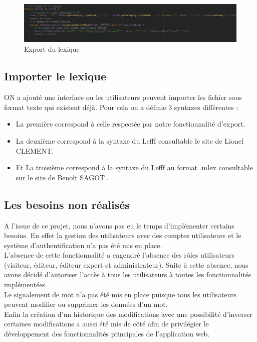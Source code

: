 \documentclass[12pt,a4paper]{article}
\begin{document}
    \begin{figure}[h]
        \centering
        \includegraphics[width=150mm]{img/exportLexique.PNG}
        \caption{Export du lexique}
        \label{Export}
    \end{figure}

    \subsection{Importer le lexique}

    ON a ajouté une interface ou les utilisateurs peuvent importer les fichier sous format texte qui existent déjà. Pour cela on a définie 3 syntaxes différentes :
    \begin{itemize}
        \item La première correspond à celle respectée par notre fonctionnalité d'export.
        \item La deuxième correspond à la syntaxe du Lefff consultable le site de Lionel CLEMENT.
        \item Et La troisième correspond à la syntaxe du Lefff au format .mlex consultable sur le site de Benoît SAGOT..
    \end{itemize}

    \subsection{Les besoins non réalisés}

    A l'issue de ce projet, nous n'avons pas eu le temps d'implémenter certains besoins.
    En effet la gestion des utilisateurs avec des comptes utilisateurs et le système d'authentification n'a pas été mis en place. \\
    L'absence de cette fonctionnalité a engendré l'absence des rôles utilisateurs (visiteur, éditeur, éditeur expert et administrateur). Suite à cette absence, nous avons décidé d'autoriser l'accès à tous les utilisateurs à toutes les fonctionnalités implémentées. \\
    Le signalement de mot n'a pas été mis en place puisque tous les utilisateurs peuvent modifier ou supprimer les données d'un mot. \\
    Enfin la création d'un historique des modifications avec une possibilité d'inverser certaines modifications a aussi été mis de côté afin de privilégier le développement des fonctionnalités principales de l'application web.
\end{document}
